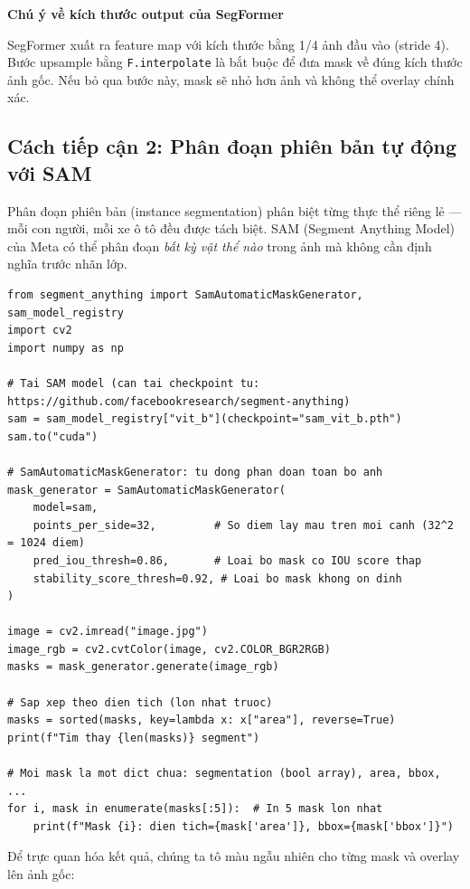 \begin{mdframed}[style=infobox]
\textbf{Chú ý về kích thước output của SegFormer}

SegFormer xuất ra feature map với kích thước bằng 1/4 ảnh đầu vào (stride 4). Bước upsample bằng \texttt{F.interpolate} là bắt buộc để đưa mask về đúng kích thước ảnh gốc. Nếu bỏ qua bước này, mask sẽ nhỏ hơn ảnh và không thể overlay chính xác.
\end{mdframed}

\subsection{Cách tiếp cận 2: Phân đoạn phiên bản tự động với SAM}
\label{subsec:seg_sam}

Phân đoạn phiên bản (instance segmentation) phân biệt từng thực thể riêng lẻ --- mỗi con người, mỗi xe ô tô đều được tách biệt. SAM (Segment Anything Model) của Meta có thể phân đoạn \textit{bất kỳ vật thể nào} trong ảnh mà không cần định nghĩa trước nhãn lớp.

\begin{verbatim}
from segment_anything import SamAutomaticMaskGenerator, sam_model_registry
import cv2
import numpy as np

# Tai SAM model (can tai checkpoint tu: https://github.com/facebookresearch/segment-anything)
sam = sam_model_registry["vit_b"](checkpoint="sam_vit_b.pth")
sam.to("cuda")

# SamAutomaticMaskGenerator: tu dong phan doan toan bo anh
mask_generator = SamAutomaticMaskGenerator(
    model=sam,
    points_per_side=32,         # So diem lay mau tren moi canh (32^2 = 1024 diem)
    pred_iou_thresh=0.86,       # Loai bo mask co IOU score thap
    stability_score_thresh=0.92, # Loai bo mask khong on dinh
)

image = cv2.imread("image.jpg")
image_rgb = cv2.cvtColor(image, cv2.COLOR_BGR2RGB)
masks = mask_generator.generate(image_rgb)

# Sap xep theo dien tich (lon nhat truoc)
masks = sorted(masks, key=lambda x: x["area"], reverse=True)
print(f"Tim thay {len(masks)} segment")

# Moi mask la mot dict chua: segmentation (bool array), area, bbox, ...
for i, mask in enumerate(masks[:5]):  # In 5 mask lon nhat
    print(f"Mask {i}: dien tich={mask['area']}, bbox={mask['bbox']}")
\end{verbatim}

Để trực quan hóa kết quả, chúng ta tô màu ngẫu nhiên cho từng mask và overlay lên ảnh gốc:

